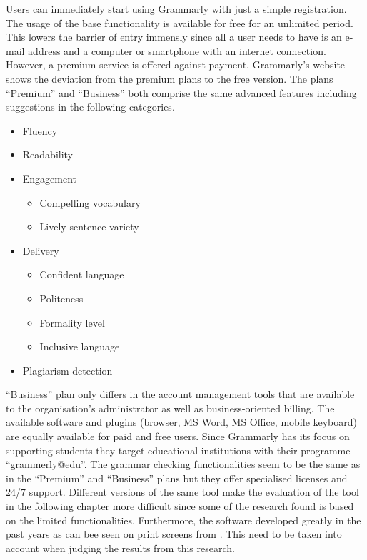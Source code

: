 \documentclass[runningheads]{llncs}
\begin{document}
Users can immediately start using Grammarly with just a simple registration. The usage of the base functionality is available for free for an unlimited period. This lowers the barrier of entry immensly since all a user needs to have is an e-mail address and a computer or smartphone with an internet connection. However, a premium service is offered against payment. Grammarly's website \citep{noauthor_write_nodate} shows the deviation from the premium plans to the free version. The plans ``Premium'' and ``Business'' both comprise the same advanced features including suggestions in the following categories.
\begin{itemize}
 \item Fluency
 \item Readability
 \item Engagement
 \begin{itemize}
  \item Compelling vocabulary
  \item Lively sentence variety
 \end{itemize}
 \item Delivery
 \begin{itemize}
  \item Confident language
  \item Politeness
  \item Formality level
  \item Inclusive language
 \end{itemize}
 \item Plagiarism detection
\end{itemize}
``Business'' plan only differs in the account management tools that are available to the organisation's administrator as well as business-oriented billing. The available software and plugins (browser, MS Word, MS Office, mobile keyboard) are equally available for paid and free users. Since Grammarly has its focus on supporting students they target educational institutions with their programme ``grammerly@edu''. The grammar checking functionalities seem to be the same as in the ``Premium'' and ``Business'' plans but they offer specialised licenses and 24/7 support. Different versions of the same tool make the evaluation of the tool in the following chapter more difficult since some of the research found is based on the limited functionalities. Furthermore, the software developed greatly in the past years as can bee seen on print screens from \textcite{dembsey_closing_2017}. This need to be taken into account when judging the results from this research.
\end{document}
